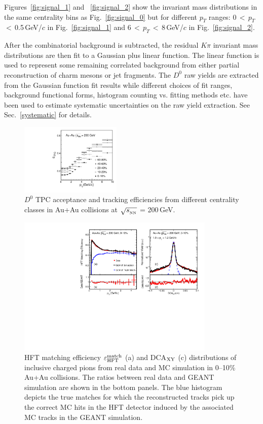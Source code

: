 \documentclass[%
 reprint,	
 amsmath,amssymb,
 aps,
 prc,
]{revtex4-1}
\begin{document}
Figures~\ref{fig:signal_1} and ~\ref{fig:signal_2} show the invariant mass distributions in the same centrality bins as Fig.~\ref{fig:signal_0} but for different $p_T$ ranges: 0\,$<$\,$p_{T}$\,$<$\,0.5\,GeV/$c$ in Fig.~\ref{fig:signal_1} and 6\,$<$\,$p_{T}$\,$<$\,8\,GeV/$c$ in Fig.~\ref{fig:signal_2}.

After the combinatorial background is subtracted, the residual $K\pi$ invariant mass distributions are then fit to a Gaussian plus linear function. The linear function is used to represent some remaining correlated background from either partial reconstruction of charm mesons or jet fragments.
The $D^0$ raw yields are extracted from the Gaussian function fit results while different choices of fit ranges, background functional forms, histogram counting vs. fitting methods etc. have been used to estimate systematic uncertainties on the raw yield extraction. See Sec.~\ref{systematic} for details.

\begin{figure}
\centering
\includegraphics[width=0.43\textwidth]{fig/Datad0Eff_tpc_10.pdf}
  \caption{$D^{0}$ TPC acceptance and tracking efficiencies from different centrality classes in Au+Au collisions at $\sqrt{s_{_{\rm NN}}}$ = 200\,GeV.}
\label{fig:Datad0Eff_tpc} 
\end{figure}

\begin{figure}
\centering
\includegraphics[width=0.84\textwidth]{fig/HijingRatioDca.pdf}
\caption{HFT matching efficiency $\varepsilon_{\rm HFT}^{\rm match}$ (a) and DCA$_{\rm XY}$ (c) distributions of inclusive charged pions from real data and MC simulation in 0--10\% Au+Au collisions. The ratios between real data and GEANT simulation are shown in the bottom panels. The blue histogram depicts the true matches for which the reconstructed tracks pick up the correct MC hits in the HFT detector induced by the associated MC tracks in the GEANT simulation.}
\label{fig:HijingRatioDca} 
\end{figure}
\end{document}
